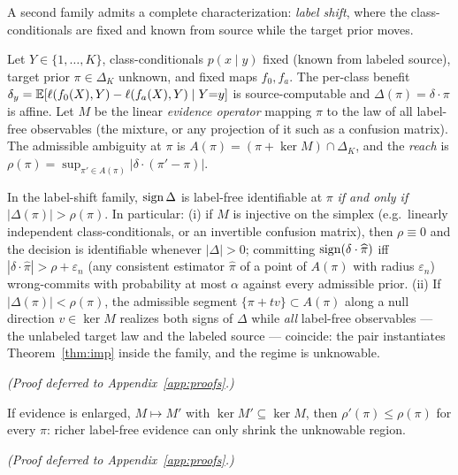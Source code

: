 
A second family admits a complete characterization: \emph{label shift}, where the
class-conditionals are fixed and known from source while the target prior moves.

\begin{definition}\label{def:lsreach}
Let $Y\in\{1,\dots,K\}$, class-conditionals $p(x\mid y)$ fixed (known from labeled
source), target prior $\pi\in\Delta_K$ unknown, and fixed maps $f_0,f_a$. The per-class
benefit $\delta_y=\mathbb{E}[\ell(f_0(X),Y)-\ell(f_a(X),Y)\mid Y{=}y]$ is source-computable and
$\Delta(\pi)=\delta\cdot\pi$ is affine. Let $M$ be the linear \emph{evidence operator}
mapping $\pi$ to the law of all label-free observables (the mixture, or any projection
of it such as a confusion matrix). The admissible ambiguity at $\pi$ is
$A(\pi)=(\pi+\ker M)\cap\Delta_K$, and the \emph{reach} is
$\rho(\pi)=\sup_{\pi'\in A(\pi)}|\delta\cdot(\pi'-\pi)|$.
\end{definition}

\begin{theorem}\label{thm:ls-iff}
In the label-shift family, $\operatorname{sign}\Delta$ is label-free identifiable at $\pi$ \emph{if
and only if} $|\Delta(\pi)|>\rho(\pi)$. In particular:
\textup{(i)} if $M$ is injective on the simplex (e.g.\ linearly independent
class-conditionals, or an invertible confusion matrix), then $\rho\equiv0$ and the
decision is identifiable whenever $|\Delta|>0$; committing
$\operatorname{sign}(\delta\cdot\widehat\pi)$ iff $|\delta\cdot\widehat\pi|>\rho+\varepsilon_n$ (any
consistent estimator $\widehat\pi$ of a point of $A(\pi)$ with radius $\varepsilon_n$)
wrong-commits with probability at most $\alpha$ against every admissible prior.
\textup{(ii)} If $|\Delta(\pi)|<\rho(\pi)$, the admissible segment
$\{\pi+tv\}\subset A(\pi)$ along a null direction $v\in\ker M$ realizes both signs of
$\Delta$ while \emph{all} label-free observables --- the unlabeled target law and the
labeled source --- coincide: the pair instantiates Theorem~\ref{thm:imp} inside the
family, and the regime is unknowable.
\end{theorem}
\emph{(Proof deferred to Appendix~\ref{app:proofs}.)}

\begin{proposition}\label{prop:reach-mono}
If evidence is enlarged, $M\mapsto M'$ with $\ker M'\subseteq\ker M$, then
$\rho'(\pi)\le\rho(\pi)$ for every $\pi$: richer label-free evidence can only shrink
the unknowable region.
\end{proposition}
\emph{(Proof deferred to Appendix~\ref{app:proofs}.)}

